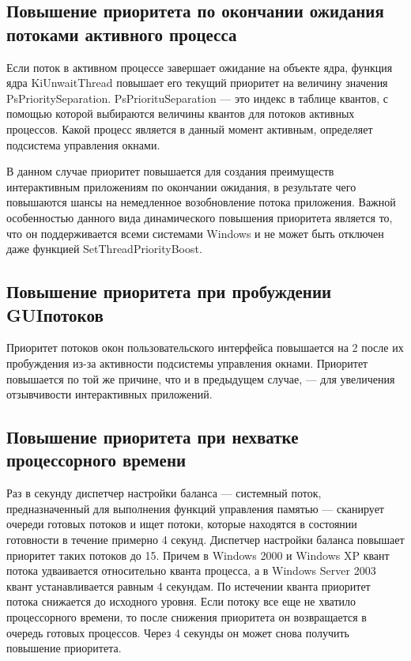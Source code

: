 \documentclass[12pt]{report}
\begin{document}
\subsection{Повышение приоритета по окончании ожидания потоками активного процесса}

Если поток в активном процессе завершает ожидание на объекте ядра, функция ядра KiUnwaitThread повышает его текущий приоритет на величину значения PsPrioritySeparation. PsPriorituSeparation — это индекс
в таблице квантов, с помощью которой выбираются величины квантов для потоков активных процессов. Какой процесс является в данный момент активным, определяет подсистема управления окнами.

В данном случае приоритет повышается для создания преимуществ интерактивным приложениям по окончании ожидания, в результате
чего повышаются шансы на немедленное возобновление потока приложения. Важной особенностью данного вида динамического
повышения приоритета является то, что он поддерживается всеми системами Windows и не может быть отключен даже функцией SetThreadPriorityBoost.

\subsection{Повышение приоритета при пробуждении GUIпотоков}
Приоритет потоков окон пользовательского интерфейса повышается на 2 после их пробуждения из-за активности подсистемы управления окнами. Приоритет повышается по той же причине, что и в предыдущем случае, — для увеличения отзывчивости интерактивных приложений.

\subsection{Повышение приоритета при нехватке процессорного времени}
Раз в секунду диспетчер настройки баланса — системный поток, предназначенный	для	выполнения	функций	управления	памятью	— сканирует очереди готовых потоков и ищет потоки, которые находятся в состоянии готовности в течение примерно 4 секунд. Диспетчер настройки баланса повышает приоритет таких потоков до 15. Причем в Windows 2000 и Windows XP квант потока удваивается относительно кванта процесса, а в Windows Server 2003 квант устанавливается равным 4 секундам. По истечении кванта приоритет потока снижается до исходного уровня. Если потоку все еще не хватило процессорного времени, то после снижения приоритета он возвращается в очередь готовых процессов. Через 4 секунды он может снова получить повышение приоритета.
\end{document}

